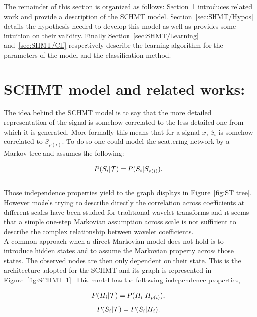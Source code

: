 \documentclass[a4paper,11pt]{report}
\begin{document}
  The remainder of this section is organized as follows: Section~\ref{sec:SHMT/Rel work} introduces related work and provide a description of the SCHMT model. Section~\ref{sec:SHMT/Hypos} details the hypothesis needed to develop this model as well as provides some intuition on their validity. Finally Section~\ref{sec:SHMT/Learning} and~\ref{sec:SHMT/Clf} respectively describe the learning algorithm for the parameters of the model and the classification method.

  
  \section{SCHMT model and related works:}
    \label{sec:SHMT/Rel work}
      
    The idea behind the SCHMT model is to say that the more detailed representation of the signal is somehow correlated to the less detailed one from which it is generated. More formally this means that for a signal $x$, $S_{i}$ is somehow correlated to $S_{\rho(i)}$. To do so one could model the scattering network by a Markov tree and assumes the following:
    
    \begin{equation}
      P(S_{i} |\mathcal{T}) = P(S_{i} | S_{\rho(i)}).
      \label{eq:SMT - false hypo}
    \end{equation}\\

    Those independence properties yield to the graph displays in Figure~\ref{fig:ST tree}. However models trying to describe directly the correlation across coefficients at different scales have been studied for traditional wavelet transforms \cite{crouse1998wavelet} and it seems that a simple one-step Markovian assumption across scale is not sufficient to describe the complex relationship between wavelet coefficients.\\
    
    A common approach when a direct Markovian model does not hold is to introduce hidden states and to assume the Markovian property across those states. The observed nodes are then only dependent on their state. This is the architecture adopted for the SCHMT and its graph is represented in Figure~\ref{fig:SCHMT 1}. This model has the following independence properties,
    
    \begin{equation}
      P(H_{i} |\mathcal{T}) = P(H_{i} | H_{\rho(i)}),
      \label{eq:SCHMT - hypo 1}
    \end{equation}    
    \begin{equation}
      P(S_{i} |\mathcal{T}) = P(S_{i} | H_{i}).
      \label{eq:SCHMT - hypo 2}
    \end{equation} \\
    
\end{document}

